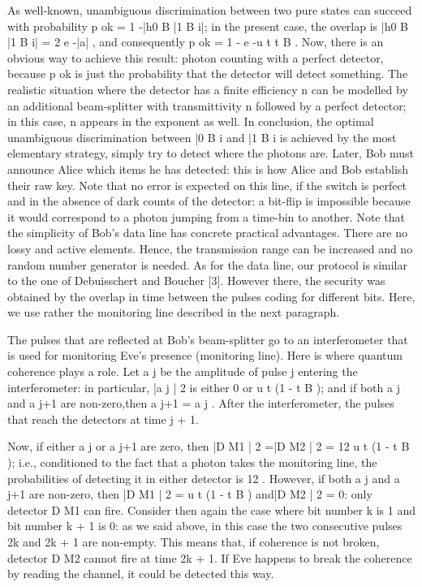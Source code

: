 As well-known, unambiguous discrimination between two pure states can succeed with probability p ok = 1 -|h0 B |1 B i|; in the present case, the overlap is |h0 B |1 B i| = 2 e -|a| , and consequently p ok = 1 - e -u t t B . Now, there is an obvious way to achieve this result: photon counting with a perfect detector, because p ok is just the probability that the detector will detect something. The realistic situation where the detector has a finite efficiency n can be modelled by an additional beam-splitter with transmittivity n followed by a perfect detector; in this case, n appears in the exponent as well. In conclusion, the optimal unambiguous discrimination between |0 B i and |1 B i is achieved by the most elementary strategy, simply try to detect where the photons are. Later, Bob must announce Alice which items he has detected: this is how Alice and Bob establish their raw key. Note that no error is expected on this line, if the switch is perfect and in the absence of dark counts of the detector: a bit-flip is impossible because it would correspond to a photon jumping from a time-bin to another. Note that the simplicity of Bob’s data line has concrete practical advantages. There are no lossy and active elements. Hence, the transmission range can be increased and no random number generator is needed. As for the data line, our protocol is similar to the one of Debuisschert and Boucher [3]. However there, the security was obtained by the overlap in time between the pulses coding for different bits. Here, we use rather the monitoring line described in the next paragraph.

The pulses that are reflected at Bob’s beam-splitter go to an interferometer that is used for monitoring Eve’s presence (monitoring line). Here is where quantum coherence plays a role. Let a j be the amplitude of pulse j entering the interferometer: in particular, |a j | 2 is either 0 or u t (1 - t B ); and if both a j and a j+1 are non-zero,then a j+1 = a j . After the interferometer, the pulses that reach the detectors at time j + 1.


Now, if either a j or a j+1 are zero, then |D M1 | 2 =|D M2 | 2 = 12 u t (1 - t B ); i.e., conditioned to the fact that a photon takes the monitoring line, the probabilities of detecting it in either detector is 12 . However, if both a j and a j+1 are non-zero, then |D M1 | 2 = u t (1 - t B ) and|D M2 | 2 = 0: only detector D M1 can fire. Consider then again the case where bit number k is 1 and bit number k + 1 is 0: as we said above, in this case the two consecutive pulses 2k and 2k + 1 are non-empty. This means that, if coherence is not broken, detector D M2 cannot fire at time 2k + 1. If Eve happens to break the coherence by reading the channel, it could be detected this way.

